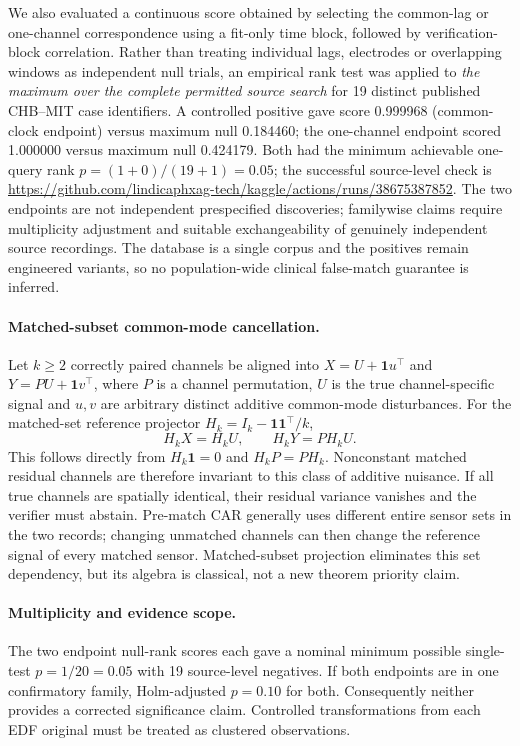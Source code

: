 We also evaluated a continuous score obtained by selecting the
common-lag or one-channel correspondence using a fit-only time
block, followed by verification-block correlation. Rather than
treating individual lags, electrodes or overlapping windows as
independent null trials, an empirical rank test was applied
to \emph{the maximum over the complete permitted source search}
for 19 distinct published CHB--MIT case identifiers. A
controlled positive gave score 0.999968 (common-clock endpoint)
versus maximum null 0.184460; the one-channel endpoint scored
1.000000 versus maximum null 0.424179. Both had the minimum
achievable one-query rank $p=(1+0)/(19+1)=0.05$; the
successful source-level check is
\url{https://github.com/lindicaphxag-tech/kaggle/actions/runs/38675387852}.
The two endpoints are not independent prespecified discoveries;
familywise claims require multiplicity adjustment and suitable
exchangeability of genuinely independent source recordings.
The database is a single corpus and the positives remain engineered
variants, so no population-wide clinical false-match guarantee is
inferred.

\paragraph{Matched-subset common-mode cancellation.}
Let $k\geq 2$ correctly paired channels be aligned into
$X=U+\mathbf{1}u^\top$ and $Y=PU+\mathbf{1}v^\top$,
where $P$ is a channel permutation, $U$ is the true
channel-specific signal and $u,v$ are arbitrary distinct
additive common-mode disturbances. For the matched-set
reference projector $H_k=I_k-\mathbf{1}\mathbf{1}^\top/k$,
\begin{equation}
H_kX=H_kU,\qquad H_kY=PH_kU .
\end{equation}
This follows directly from $H_k\mathbf{1}=0$ and
$H_kP=PH_k$. Nonconstant matched residual channels are
therefore invariant to this class of additive nuisance.
If all true channels are spatially identical, their residual
variance vanishes and the verifier must abstain.
Pre-match CAR generally uses different entire sensor sets
in the two records; changing unmatched channels can then
change the reference signal of every matched sensor.
Matched-subset projection eliminates this set dependency,
but its algebra is classical, not a new theorem priority claim.

\paragraph{Multiplicity and evidence scope.}
The two endpoint null-rank scores each gave a nominal
minimum possible single-test $p=1/20=0.05$ with 19
source-level negatives. If both endpoints are in one
confirmatory family, Holm-adjusted $p=0.10$ for both.
Consequently neither provides a corrected significance
claim. Controlled transformations from each EDF original
must be treated as clustered observations.

